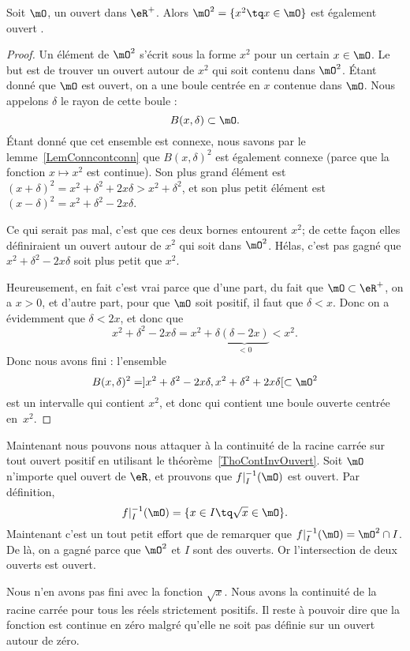 \begin{lemma}
Soit $\mO$, un ouvert dans $\eR^+$. Alors $\mO^2=\{ x^2\tq x\in\mO \}$ est également ouvert .
\end{lemma}

\begin{proof}
Un élément de $\mO^2$ s'écrit sous la forme $x^2$ pour un certain $x\in\mO$. Le but est de trouver un ouvert autour de $x^2$ qui soit contenu dans $\mO^2$. Étant donné que $\mO$ est ouvert, on a une boule centrée en $x$ contenue dans $\mO$. Nous appelons $\delta$ le rayon de cette boule :
\[
  B(x,\delta)\subset\mO.
\]
Étant donné que cet ensemble est connexe, nous savons par le lemme~\ref{LemConncontconn} que $B(x,\delta)^2$ est également connexe (parce que la fonction $x\mapsto x^2$ est continue). Son plus grand élément est $(x+\delta)^2=x^2+\delta^2+2x\delta>x^2+\delta^2$, et son plus petit élément est $(x-\delta)^2=x^2+\delta^2-2x\delta$.

Ce qui serait pas mal, c'est que ces deux bornes entourent $x^2$; de cette façon elles définiraient un ouvert autour de $x^2$ qui soit dans $\mO^2$. Hélas, c'est pas gagné que $x^2+\delta^2-2x\delta$ soit plus petit que $x^2$.

Heureusement, en fait c'est vrai parce que d'une part, du fait que $\mO\subset\eR^+$, on a $x>0$, et d'autre part, pour que $\mO$ soit positif, il faut que $\delta<x$. Donc on a évidemment que $\delta<2x$, et donc que
\[
  x^2+\delta^2-2x\delta=x^2+\delta\underbrace{(\delta-2x)}_{<0}<x^2.
\]
Donc nous avons fini : l'ensemble
\[
  B(x,\delta)^2=]x^2+\delta^2-2x\delta,x^2+\delta^2+2x\delta[\subset\mO^2
\]
est un intervalle qui contient $x^2$, et donc qui contient une boule ouverte centrée en~$x^2$.

\end{proof}

Maintenant nous pouvons nous attaquer à la continuité de la racine carrée sur tout ouvert positif en utilisant le théorème~\ref{ThoContInvOuvert}. Soit $\mO$ n'importe quel ouvert de $\eR$, et prouvons que $f|_I^{-1}(\mO)$ est ouvert. Par définition,
\begin{equation}
  f|_I^{-1}(\mO)=\{ x\in I\tq \sqrt{x}\in\mO \}.
\end{equation}
Maintenant c'est un tout petit effort que de remarquer que $f|_I^{-1}(\mO)=\mO^2\cap I$. De là, on a gagné parce que $\mO^2$ et $I$ sont des ouverts. Or l'intersection de deux ouverts est ouvert.

Nous n'en avons pas fini avec la fonction $\sqrt{x}$. Nous avons la continuité de la racine carrée pour tous les réels strictement positifs. Il reste à pouvoir dire que la fonction est continue en zéro malgré qu'elle ne soit pas définie sur un ouvert autour de zéro.

